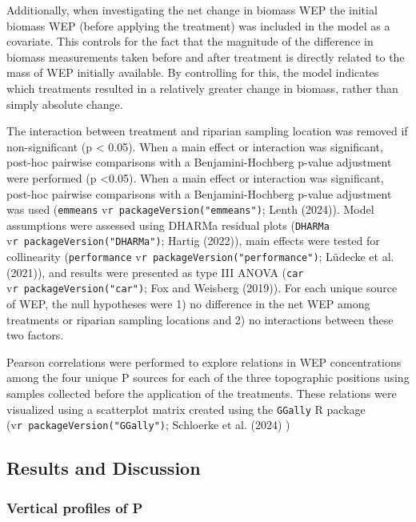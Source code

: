 \documentclass[
]{agujournal2019}
\begin{document}
Additionally, when investigating the net change in biomass WEP the
initial biomass WEP (before applying the treatment) was included in the
model as a covariate. This controls for the fact that the magnitude of
the difference in biomass measurements taken before and after treatment
is directly related to the mass of WEP initially available. By
controlling for this, the model indicates which treatments resulted in a
relatively greater change in biomass, rather than simply absolute
change.

The interaction between treatment and riparian sampling location was
removed if non-significant (p \textless{} 0.05). When a main effect or
interaction was significant, post-hoc pairwise comparisons with a
Benjamini-Hochberg p-value adjustment were performed (p \textless0.05).
When a main effect or interaction was significant, post-hoc pairwise
comparisons with a Benjamini-Hochberg p-value adjustment was used
(\texttt{emmeans} v\texttt{r\ packageVersion("emmeans")}; Lenth (2024)).
Model assumptions were assessed using DHARMa residual plots
(\texttt{DHARMa} v\texttt{r\ packageVersion("DHARMa")}; Hartig (2022)),
main effects were tested for collinearity (\texttt{performance}
v\texttt{r\ packageVersion("performance")}; Lüdecke et al. (2021)), and
results were presented as type III ANOVA (\texttt{car}
v\texttt{r\ packageVersion("car")}; Fox and Weisberg (2019)). For each
unique source of WEP, the null hypotheses were 1) no difference in the
net WEP among treatments or riparian sampling locations and 2) no
interactions between these two factors.

Pearson correlations were performed to explore relations in WEP
concentrations among the four unique P sources for each of the three
topographic positions using samples collected before the application of
the treatments. These relations were visualized using a scatterplot
matrix created using the \texttt{GGally} R package
(v\texttt{r\ packageVersion("GGally")}; Schloerke et al. (2024) )

\subsection{Results and Discussion}\label{results-and-discussion}

\subsubsection{Vertical profiles of P}\label{vertical-profiles-of-p}
\end{document}
